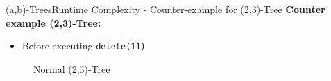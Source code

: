 


\begin{frame}{(a,b)-Trees}{Runtime Complexity - Counter-example for (2,3)-Tree}
  \textbf{Counter example (2,3)-Tree:}
  \begin{itemize}
    \item<2->
      Before executing \texttt{\color{MainA}delete(11)}
  \end{itemize}
  \begin{figure}
    \begin{adjustbox}{width=0.6\linewidth}
      
    \end{adjustbox}
    \label{fig:a_b_tree:2_3_tree_1}
    \caption{Normal (2,3)-Tree}
  \end{figure}
\end{frame}


